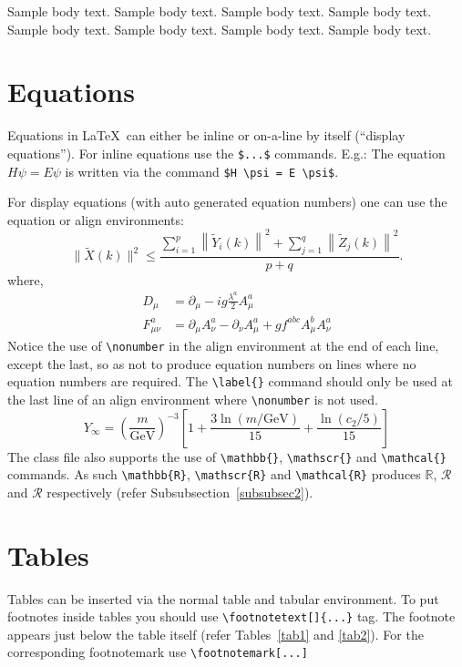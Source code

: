 \documentclass[sn-nature]{sn-jnl}%
\theoremstyle{thmstyleone}%
\theoremstyle{thmstyletwo}%
\theoremstyle{thmstylethree}%
\begin{document}
Sample body text. Sample body text. Sample body text. Sample body text. Sample body text. Sample body text. Sample body text. Sample body text. 

\section{Equations}\label{sec4}

Equations in \LaTeX\ can either be inline or on-a-line by itself (``display equations''). For
inline equations use the \verb+$...$+ commands. E.g.: The equation
$H\psi = E \psi$ is written via the command \verb+$H \psi = E \psi$+.

For display equations (with auto generated equation numbers)
one can use the equation or align environments:
\begin{equation}
\|\tilde{X}(k)\|^2 \leq\frac{\sum\limits_{i=1}^{p}\left\|\tilde{Y}_i(k)\right\|^2+\sum\limits_{j=1}^{q}\left\|\tilde{Z}_j(k)\right\|^2 }{p+q}.\label{eq1}
\end{equation}
where,
\begin{align}
D_\mu &=  \partial_\mu - ig \frac{\lambda^a}{2} A^a_\mu \nonumber \\
F^a_{\mu\nu} &= \partial_\mu A^a_\nu - \partial_\nu A^a_\mu + g f^{abc} A^b_\mu A^a_\nu \label{eq2}
\end{align}
Notice the use of \verb+\nonumber+ in the align environment at the end
of each line, except the last, so as not to produce equation numbers on
lines where no equation numbers are required. The \verb+\label{}+ command
should only be used at the last line of an align environment where
\verb+\nonumber+ is not used.
\begin{equation}
Y_\infty = \left( \frac{m}{\textrm{GeV}} \right)^{-3}
    \left[ 1 + \frac{3 \ln(m/\textrm{GeV})}{15}
    + \frac{\ln(c_2/5)}{15} \right]
\end{equation}
The class file also supports the use of \verb+\mathbb{}+, \verb+\mathscr{}+ and
\verb+\mathcal{}+ commands. As such \verb+\mathbb{R}+, \verb+\mathscr{R}+
and \verb+\mathcal{R}+ produces $\mathbb{R}$, $\mathscr{R}$ and $\mathcal{R}$
respectively (refer Subsubsection~\ref{subsubsec2}).

\section{Tables}\label{sec5}

Tables can be inserted via the normal table and tabular environment. To put
footnotes inside tables you should use \verb+\footnotetext[]{...}+ tag.
The footnote appears just below the table itself (refer Tables~\ref{tab1} and \ref{tab2}). 
For the corresponding footnotemark use \verb+\footnotemark[...]+
\end{document}
